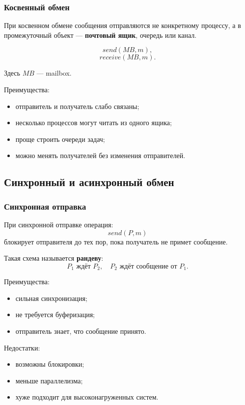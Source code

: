 \documentclass[12pt,a4paper]{article}
\begin{document}
\subsubsection{Косвенный обмен}

При косвенном обмене сообщения отправляются не конкретному процессу, а в промежуточный объект --- \textbf{почтовый ящик}, очередь или канал.

\[
send(MB, m),
\]
\[
receive(MB, m).
\]

Здесь $MB$ --- mailbox.

Преимущества:
\begin{itemize}
    \item отправитель и получатель слабо связаны;
    \item несколько процессов могут читать из одного ящика;
    \item проще строить очереди задач;
    \item можно менять получателей без изменения отправителей.
\end{itemize}

\subsection{Синхронный и асинхронный обмен}

\subsubsection{Синхронная отправка}

При синхронной отправке операция:
\[
send(P, m)
\]
блокирует отправителя до тех пор, пока получатель не примет сообщение.

Такая схема называется \textbf{рандеву}:
\[
P_1 \text{ ждёт } P_2,
\quad
P_2 \text{ ждёт сообщение от } P_1.
\]

Преимущества:
\begin{itemize}
    \item сильная синхронизация;
    \item не требуется буферизация;
    \item отправитель знает, что сообщение принято.
\end{itemize}

Недостатки:
\begin{itemize}
    \item возможны блокировки;
    \item меньше параллелизма;
    \item хуже подходит для высоконагруженных систем.
\end{itemize}
\end{document}
